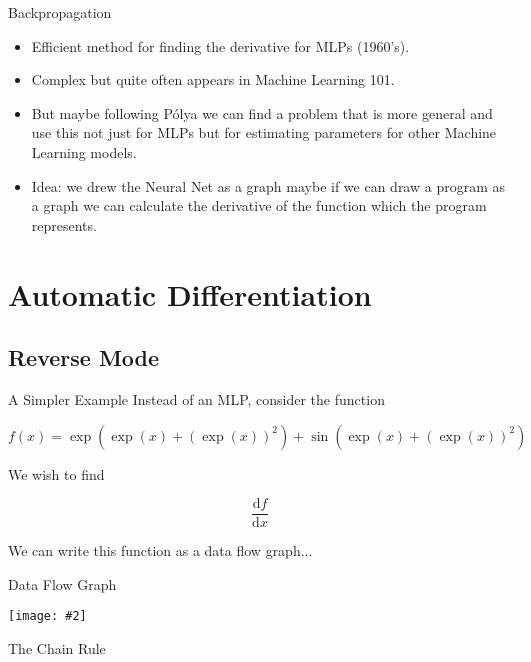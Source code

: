 \documentclass{beamer}
\newcommand {\framedgraphic}[2] {
    \begin{frame}{#1}
        \begin{center}
            \texttt{[image: \#2]}
        \end{center}
    \end{frame}
}
\begin{document}
\begin{frame}[fragile]{Backpropagation}
\begin{itemize}
\item Efficient method for finding the derivative for MLPs (1960's).
\pause
\item Complex but quite often appears in Machine Learning 101.
\pause
\item But maybe following P\'{o}lya we can find a problem that is more
  general and use this not just for MLPs but for estimating parameters
  for other Machine Learning models.
\pause
\item Idea: we drew the Neural Net as a graph maybe if we can draw a
  program as a graph we can calculate the derivative of the function
  which the program represents.
\end{itemize}
\end{frame}

\section{Automatic Differentiation}

\subsection{Reverse Mode}

\begin{frame}[fragile]{A Simpler Example}
Instead of an MLP, consider the function

$$
f(x) = \exp(\exp(x) + (\exp(x))^2) + \sin(\exp(x) + (\exp(x))^2)
$$

We wish to find

$$
\frac{\mathrm{d} f}{\mathrm{d} x}
$$

We can write this function as a data flow graph...
\end{frame}

\framedgraphic{Data Flow Graph}{diagrams/Fita3.png}

\begin{frame}[fragile]{The Chain Rule}
\end{frame}
\end{document}

